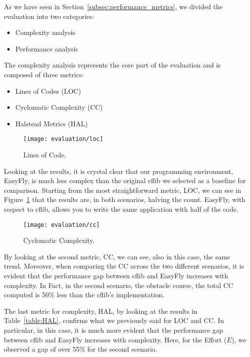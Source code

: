 As we have seen in Section~\ref{subsec:performance_metrics}, we divided the evaluation into two categories:
\begin{itemize}
    \item Complexity analysis
    \item Performance analysis
\end{itemize}

The complexity analysis represents the core part of the evaluation and is composed of three metrics:
\begin{itemize}
    \item Lines of Codes (LOC)
    \item Cyclomatic Complexity (CC)
    \item Halstead Metrics (HAL)
\end{itemize}

\begin{figure}[t]
    \centering
    \texttt{[image: evaluation/loc]}
    \caption{Lines of Code.}\label{fig:loc_count}
\end{figure}

Looking at the results, it is crystal clear that our programming environment, EasyFly, is much less complex than the original cflib we selected as a baseline for comparison.
Starting from the most straightforward metric, LOC, we can see in Figure~\ref{fig:loc_count} that the results are, in both scenarios, halving the count.
EasyFly, with respect to cflib, allows you to write the same application with half of the code.

\begin{figure}[t]
    \centering
    \texttt{[image: evaluation/cc]}
    \caption{Cyclomatic Complexity.}\label{fig:cc}
\end{figure}

By looking at the second metric, CC, we can see, also in this case, the same trend.
Moreover, when comparing the CC across the two different scenarios, it is evident that the performance gap between cflib and EasyFly increases with complexity.
In Fact, in the second scenario, the obstacle course, the total CC computed is 50\% less than the cflib's implementation.

The last metric for complexity, HAL, by looking at the results in Table~\ref{table:HAL}, confirms what we previously said for LOC and CC. 
In particular, in this case, it is much more evident that the performance gap between cflib and EasyFly increases with complexity.
Here, for the Effort (\( E \)), we observed a gap of over 55\% for the second scenario.

